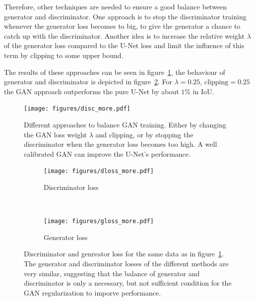 \documentclass[aps,prl,twocolumn,groupedaddress,amsmath,amssymb]{revtex4-1}
\begin{document}
    Therefore, other techniques are needed to ensure a good balance between generator and
    discriminator. One approach is to stop the discriminator training whenever the generator loss
    becomes to big, to give the generator a chance to catch up with the discriminator. Another  idea
    is to increase the relative weight $\lambda$ of the generator loss compared to the U-Net loss
    and limit the influence of this term by clipping to some upper bound.

    

    The results of these approaches can be seen in figure~\ref{fig:better_gan}, the behaviour of 
    generator and discriminator is depicted in figure~\ref{fig:better_gan_dgloss}. For 
    $\lambda=0.25$, $\mathrm{clipping}=0.25$ the GAN approach outperforms the pure U-Net by about 
    $1\%$ in IoU. 

    \begin{figure}[tbp]
        \begin{center}
        \texttt{[image: figures/disc\_more.pdf]}
        \end{center}
        \caption{Different approaches to balance GAN training. Either by changing the GAN loss 
        weight $\lambda$ and clipping, or by stopping the discriminator when the generator loss 
        becomes too high. A well calibrated GAN can improve the U-Net's performance.}
        \label{fig:better_gan}
    \end{figure}

    \begin{figure}[tbp]
        \begin{center}
        \begin{subfigure}[c]{\linewidth}
            \texttt{[image: figures/dloss\_more.pdf]}
            \caption{Discriminator loss}
        \end{subfigure}\\
        \begin{subfigure}[c]{\linewidth}
             \texttt{[image: figures/gloss\_more.pdf]}
            \caption{Generator loss}
        \end{subfigure}
        \end{center}
        \caption{Discriminator and genreator loss for the same data as in figure~\ref{fig:better_gan}.
        The generator and discriminator losses of the different methods are very similar, suggesting
        that the balance of generator and discriminator is only a necessary, but not sufficient
        condition for the GAN regularization to imporve performance.}
        \label{fig:better_gan_dgloss}
    \end{figure}
\end{document}
